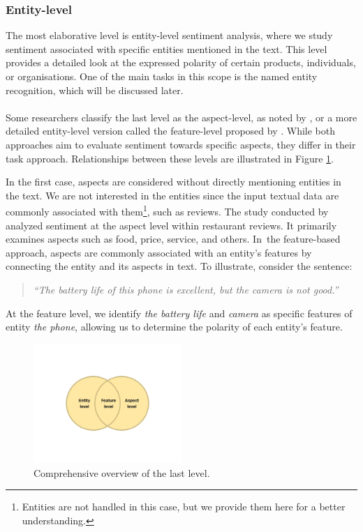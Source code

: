 \subsubsection*{Entity-level}
\label{subsubsec:entity-level}
The most elaborative level is entity-level sentiment analysis, where we study sentiment associated with specific entities mentioned in the text. This level provides a detailed look at the expressed polarity of certain products, individuals, or organisations. One of the main tasks in this scope is the named entity recognition, which will be discussed later.

\paragraph{}

Some researchers classify the last level as the aspect-level, as noted by \cite{Wankhade2022}, or a more detailed entity-level version called the feature-level proposed by \cite{Jenifer2017}. While both approaches aim to evaluate sentiment towards specific aspects, they differ in their task approach. Relationships between these levels are illustrated in Figure \ref{fig:entity-feature-aspect-level}.

In the first case, aspects are considered without directly mentioning entities in the text. We are not interested in the entities since the input textual data are commonly associated with them\footnote{Entities are not handled in this case, but we provide them here for a better understanding.}, such as reviews. The study conducted by \cites{Wang2019} analyzed sentiment at the aspect level within restaurant reviews. It primarily examines aspects such as food, price, service, and others. In~the feature-based approach, aspects are commonly associated with an entity's features by connecting the entity and its aspects in text. To illustrate, consider the sentence:\begin{quote}
    \textit{``The battery life of this phone is excellent, but the camera is not good.''}
\end{quote} At the feature level, we identify \textit{the battery life} and \textit{camera} as specific features of entity \textit{the phone}, allowing us to determine the polarity of each entity's feature.

\begin{figure}[H]
    \centering
    \includegraphics[width=0.5\textwidth]{img/entity-feature-aspect-level.pdf}
    \caption{Comprehensive overview of the last level.}
    \label{fig:entity-feature-aspect-level}
\end{figure}

